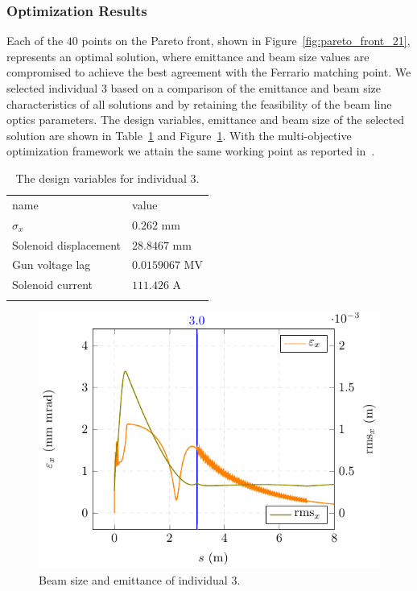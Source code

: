 \subsubsection{Optimization Results}

Each of the $40$ points on the Pareto front, shown in
  Figure~\ref{fig:pareto_front_21}, represents an optimal solution, where
  emittance and beam size values are compromised to achieve the best agreement
  with the Ferrario matching point.
We selected individual $3$ based on a comparison of the emittance and beam size
  characteristics of all solutions and by retaining the feasibility of the
  beam line optics parameters.
The design variables, emittance and beam size of the selected solution are
  shown in Table~\ref{tbl:des_vars} and Figure~\ref{fig:rmsemit}.
With the multi-objective optimization framework we attain the same working
  point as reported in~\cite{pedr:10}.

\begin{table}
  \begin{center}
    \caption{The design variables for individual $3$.}
    \label{tbl:des_vars}
    \begin{tabular}{ll}
      \hline\noalign{\smallskip}
      name & value \\
      \noalign{\smallskip}\hline\noalign{\smallskip}
        $\sigma_{x}$          & $0.262$ mm \\
        Solenoid displacement & $28.8467$ mm \\
        Gun voltage lag       & $0.0159067$ MV\\
        Solenoid current      & $111.426$ A \\
      \noalign{\smallskip}\hline
    \end{tabular}
  \end{center}
\end{table}

\begin{figure}%
  \centering
  \includegraphics[width=0.8\linewidth]{Report/iff_plot_emrms}
  \caption{Beam size and emittance of individual $3$.}
  \label{fig:rmsemit}
\end{figure}

